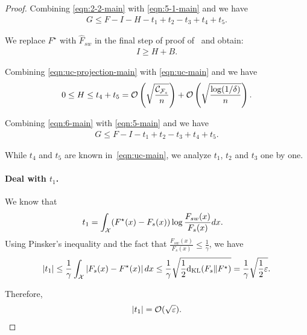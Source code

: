 \begin{proof}
Combining \eqref{eqn:2-2-main} with \eqref{eqn:5-1-main} and we have
\begin{align}
    G \le F - I - H - t_1 + t_2 - t_3 + t_4 + t_5. \label{eqn:5-main}
\end{align}

We replace $F^\star$ with $\hat{F}_{sw}$ in the final step of proof of~ and obtain:
\begin{align}
    I \ge H + B. \label{eqn:uc-projection-main}
\end{align}

Combining \eqref{eqn:uc-projection-main} with \eqref{eqn:uc-main} and we have
\begin{align}
    0 \le H \le t_4 + t_5 = \mathcal{O}\left(\sqrt{\frac{\mathcal{C}_{\mathcal{F}_s}}{n}}\right) + \mathcal{O}\left(\sqrt{\frac{\log(1/\delta)}{n}}\right). \label{eqn:6-main}
\end{align}

Combining \eqref{eqn:6-main} with \eqref{eqn:5-main} and we have
\begin{align}
    G \le F - I - t_1 + t_2 - t_3 + t_4 + t_5. \label{eqn:7-main}
\end{align}

While $t_4$ and $t_5$ are known in~\eqref{eqn:uc-main}, we analyze $t_1$, $t_2$ and $t_3$ one by one.






\paragraph{Deal with $t_1$.}

We know that
\begin{align}
    t_1 & = \int_{\mathcal{X}} (F^\star(x)-F_s(x))\log \frac{F_{sw}(x)}{F_s(x)} d x. \nonumber
\end{align}
Using Pinsker's inequality and the fact that $\frac{F_{sw}(x)}{F_s(x)} \le \frac{1}{\gamma}$, we have
\begin{align} \label{def_t_1_ineq-main}
    |t_1| \le \frac{1}{\gamma} \int_{\mathcal{X}}\left| F_s(x) - F^\star(x) \right| d x \le \frac{1}{\gamma} \sqrt{\frac{1}{2}\mathrm{d}_{\mathrm{KL}}(F_s \| F^\star)} = \frac{1}{\gamma} \sqrt{\frac{1}{2}\varepsilon}.
\end{align}

Therefore,
\begin{align} \label{equation_t_1-main}
    |t_1| = \mathcal{O}(\sqrt{\varepsilon}).
\end{align}



\end{proof}
